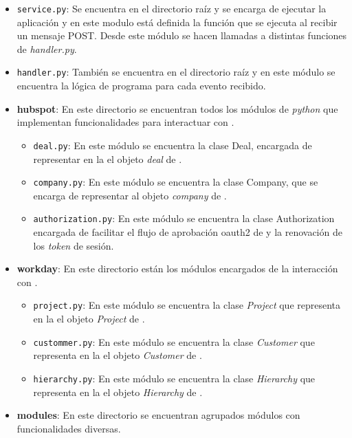 \begin{itemize}

	\item [\textendash] \texttt{service.py}: Se encuentra en el directorio raíz y se encarga de ejecutar la aplicación 
	y en este modulo está definida la función que se ejecuta al recibir un mensaje POST. Desde este módulo se hacen llamadas a distintas funciones de \textit{handler.py}.
	\item [\textendash] \texttt{handler.py}: También se encuentra en el directorio raíz y en este módulo se encuentra la lógica de programa para cada evento recibido.
	\item[\textendash] \textbf{hubspot}: En este directorio se encuentran todos los módulos de \textit{python} que implementan funcionalidades para interactuar con \hs.
	
		\begin{itemize}
			\item [\textendash] \texttt{deal.py}: En este módulo se encuentra la clase Deal, encargada de representar en la \iface{} el objeto \textit{deal} de \hs.
			\item [\textendash] \texttt{company.py}: En este módulo se encuentra la clase Company, que se encarga de representar al objeto \textit{company} de \hs{}.
			\item [\textendash] \texttt{authorization.py}: En este módulo se encuentra la clase Authorization encargada de facilitar el flujo de aprobación \gls{oauth2} de \hs{} y la renovación de los \textit{token} de sesión.
		\end{itemize}
		
	\item[\textendash] \textbf{workday}: En este directorio están los módulos encargados de la interacción con \wday.
	
		\begin{itemize}
			\item [\textendash] \texttt{project.py}: En este módulo se encuentra la clase \textit{Project} que representa en la \iface{} el objeto \textit{Project} de \wday.
			\item [\textendash] \texttt{custommer.py}: En este módulo se encuentra la clase \textit{Customer} que representa en la \iface{} el objeto \textit{Customer} de \wday.
			\item [\textendash] \texttt{hierarchy.py}: En este módulo se encuentra la clase \textit{Hierarchy} que representa en la \iface{} el objeto \textit{Hierarchy} de \wday.
		\end{itemize}
	\item[\textendash] \textbf{modules}: En este directorio se encuentran agrupados módulos con funcionalidades diversas. 
	

\end{itemize}

